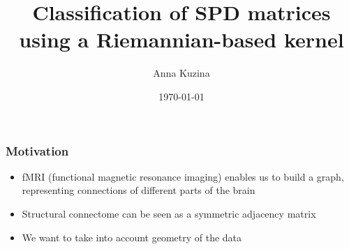 \documentclass{beamer}
\title[Classification of SPD matrices]{Classiﬁcation of SPD matrices using a Riemannian-based kernel} %
\author{Anna Kuzina} %
\institute[Skoltech, HSE] %
{
Skoltech, HSE \\ %
\medskip
\textit{anna.kuzina@skoltech.ru} %
}
\date{\today} %
\begin{document}
\begin{frame}
\titlepage %
\end{frame}




%



\begin{frame}
\frametitle{Motivation}

\begin{itemize}
	\item<1-> fMRI (functional magnetic resonance imaging) enables us to build a graph, representing connections of different parts of the brain
	\vfill
	\item<1-> 	Structural connectome can be seen as a symmetric adjacency matrix
	\vfill 
	\item<1-> We want to take into account geometry of the data
	
\end{itemize}

\end{frame}

\end{document}
